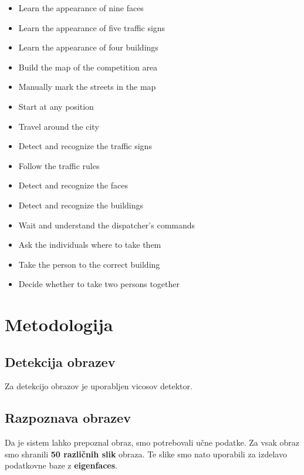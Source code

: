 \documentclass[a4paper,11pt]{article}
\begin{document}
\begin{itemize}
	\color{green}
	\item Learn the appearance of nine faces
	\item {\color{red}Learn the appearance of five traffic signs}
	\item {\color{red}Learn the appearance of four buildings}
	\item Build the map of the competition area
	\item Manually mark the streets in the map
	\item Start at any position
	\item Travel around the city
	\item {\color{red}Detect and recognize the traffic signs}
	\item {\color{red}Follow the traffic rules}
	\item Detect and recognize the faces
	\item {\color{red}Detect and recognize the buildings}
	\item Wait and understand the dispatcher's commands
	\item Ask the individuals where to take them
	\item Take the person to the correct building
	\item {\color{red}Decide whether to take two persons together}
\end{itemize}

\section{Metodologija}
\subsection{Detekcija obrazev}

Za detekcijo obrazov je uporabljen vicosov detektor.

\pagebreak
\subsection{Razpoznava obrazev}

Da je sistem lahko prepoznal obraz, smo potrebovali učne podatke. Za vsak obraz smo shranili \textbf{50 različnih slik} obraza. Te slike smo nato uporabili za izdelavo podatkovne baze z \textbf{eigenfaces}.
\end{document}
